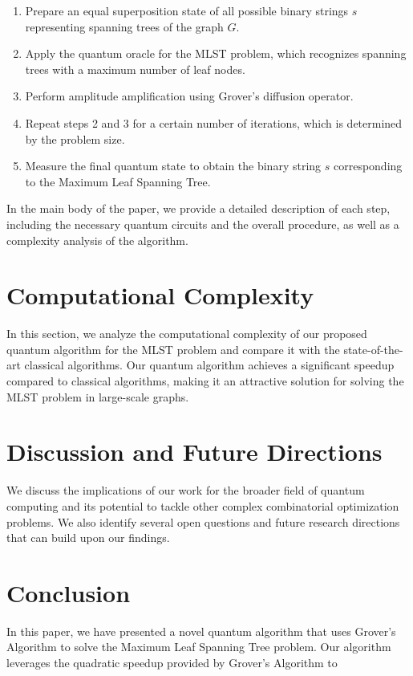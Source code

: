 \begin{enumerate}
    \item Prepare an equal superposition state of all possible binary strings $s$ representing spanning trees of the graph $G$.
    
    \item Apply the quantum oracle for the MLST problem, which recognizes spanning trees with a maximum number of leaf nodes.
    
    \item Perform amplitude amplification using Grover's diffusion operator.
    
    \item Repeat steps 2 and 3 for a certain number of iterations, which is determined by the problem size.
    
    \item Measure the final quantum state to obtain the binary string $s$ corresponding to the Maximum Leaf Spanning Tree.
\end{enumerate}

In the main body of the paper, we provide a detailed description of each step, including the necessary quantum circuits and the overall procedure, as well as a complexity analysis of the algorithm.

\section{Computational Complexity} \label{sec:complexity}
In this section, we analyze the computational complexity of our proposed quantum algorithm for the MLST problem and compare it with the state-of-the-art classical algorithms. Our quantum algorithm achieves a significant speedup compared to classical algorithms, making it an attractive solution for solving the MLST problem in large-scale graphs.

\section{Discussion and Future Directions} \label{sec:discussion}
We discuss the implications of our work for the broader field of quantum computing and its potential to tackle other complex combinatorial optimization problems. We also identify several open questions and future research directions that can build upon our findings.

\section{Conclusion} \label{sec:conclusion}
In this paper, we have presented a novel quantum algorithm that uses Grover's Algorithm to solve the Maximum Leaf Spanning Tree problem. Our algorithm leverages the quadratic speedup provided by Grover's Algorithm to

